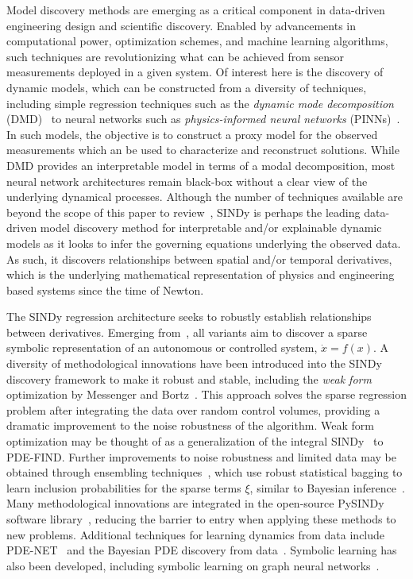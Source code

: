 \documentclass{ACCESS_latex_template_20231118/ieeeaccess}
\begin{document}
Model discovery methods are emerging as a critical component in data-driven engineering design and scientific discovery.
Enabled by advancements in computational power, optimization schemes, and machine learning algorithms, such techniques are revolutionizing what can be achieved from sensor measurements deployed in a given system.
Of interest here is the discovery of dynamic models, which can be constructed from a diversity of techniques, including simple regression techniques such as the {\em dynamic mode decomposition} (DMD)~\citep{kutz2016dynamic,ichinaga2024pydmd} to neural networks such as {\em physics-informed neural networks} (PINNs)~\citep{Raissi2019}.
In such models, the objective is to construct a proxy model for the observed measurements which an be used to characterize and reconstruct solutions.
While DMD provides an interpretable model in terms of a modal decomposition, most neural network architectures remain black-box without a clear view of the underlying dynamical processes.
Although the number of techniques available are beyond the scope of this paper to review~\citep{cuomo2022scientific,north2023review}, SINDy is perhaps the leading data-driven model discovery method for interpretable and/or explainable dynamic models as it looks to infer the governing equations underlying the observed data.
As such, it discovers relationships between spatial and/or temporal derivatives, which is the underlying mathematical representation of physics and engineering based systems since the time of Newton.

The SINDy regression architecture seeks to robustly establish relationships between derivatives.
Emerging from~\citep{Brunton2016,brunton2022data}, all variants aim to discover a sparse symbolic representation of an autonomous or controlled system, $\dot x = f(x)$.
A diversity of methodological innovations have been introduced into the SINDy discovery framework to make it robust and stable, including the \emph{weak form} optimization by Messenger and Bortz~\citep{messenger2021bweak,messenger2021weak}.
This approach solves the sparse regression problem after integrating the data over random control volumes, providing a dramatic improvement to the noise robustness of the algorithm.
Weak form optimization may be thought of as a generalization of the integral SINDy~\citep{Schaeffer2017} to PDE-FIND.
Further improvements to noise robustness and limited data may be obtained through ensembling techniques~\citep{Fasel2022}, which use robust statistical bagging to learn inclusion probabilities for the sparse terms $\xi$, similar to Bayesian inference~\citep{gao2022bayesian,gao2023convergence,Hirsh2022}.
Many methodological innovations are integrated in the open-source PySINDy software library~\citep{Kaptanoglu2022}, reducing the barrier to entry when applying these methods to new problems.  Additional techniques for learning dynamics from data include PDE-NET~\citep{Long2019,Long2018} and the Bayesian PDE discovery from data~\citep{atkinson2020bayesian}.
Symbolic learning has also been developed, including symbolic learning on graph neural networks~\citep{cranmer2019learning,cranmer2020discovering,sanchez2020learning}.
\end{document}
